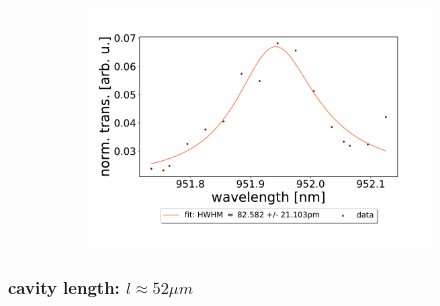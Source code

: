 \begin{figure}[h!]
\begin{subfigure}[b]{0.49\textwidth}
        \includegraphics[width=\textwidth]{figures/results/double fano fits/20250326/83um_M3:M5_fit_11.pdf}
        \caption{}
        \label{fig:83um_M3:M5_fit_11}
    \end{subfigure}
\end{figure}

\clearpage
\subsubsection*{cavity length: $l \approx 52 \mu m$}

